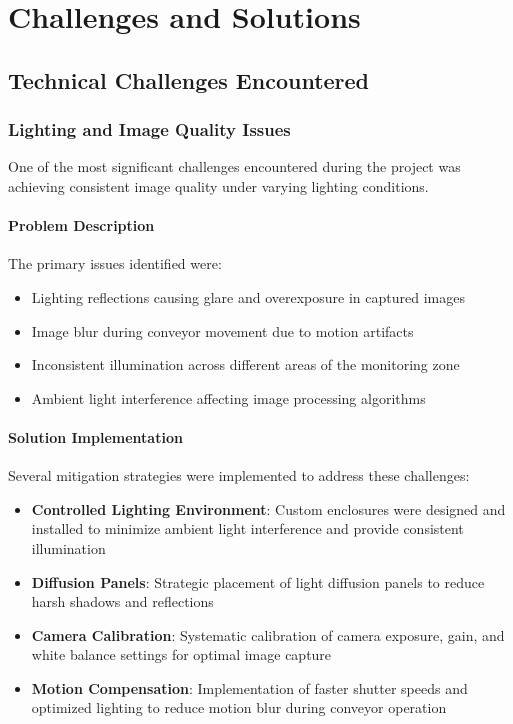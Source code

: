 \documentclass{book}
\begin{document}
\chapter{Challenges and Solutions}

\section{Technical Challenges Encountered}

\subsection{Lighting and Image Quality Issues}

\par\noindent One of the most significant challenges encountered during the project was achieving consistent image quality under varying lighting conditions.

\subsubsection{Problem Description}
\par\noindent The primary issues identified were:

\begin{itemize}
\item Lighting reflections causing glare and overexposure in captured images
\item Image blur during conveyor movement due to motion artifacts
\item Inconsistent illumination across different areas of the monitoring zone
\item Ambient light interference affecting image processing algorithms
\end{itemize}

\subsubsection{Solution Implementation}
\par\noindent Several mitigation strategies were implemented to address these challenges:

\begin{itemize}
\item \textbf{Controlled Lighting Environment}: Custom enclosures were designed and installed to minimize ambient light interference and provide consistent illumination
\item \textbf{Diffusion Panels}: Strategic placement of light diffusion panels to reduce harsh shadows and reflections
\item \textbf{Camera Calibration}: Systematic calibration of camera exposure, gain, and white balance settings for optimal image capture
\item \textbf{Motion Compensation}: Implementation of faster shutter speeds and optimized lighting to reduce motion blur during conveyor operation
\end{itemize}
\end{document}
